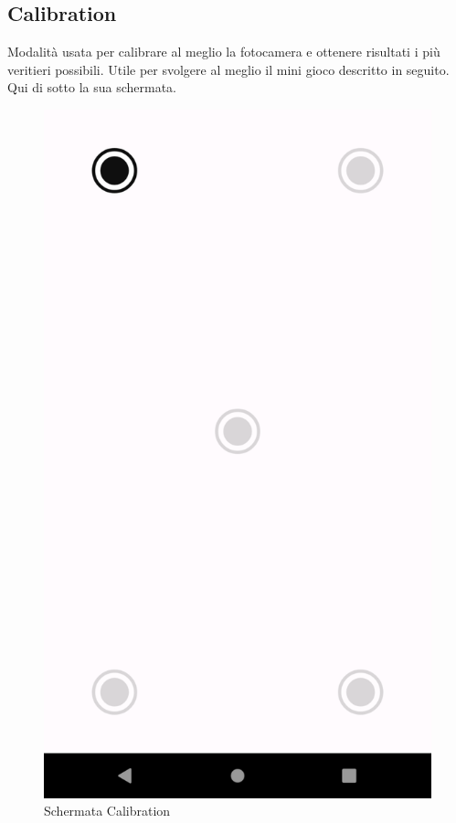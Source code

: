 \documentclass[11pt]{article}
\begin{document}
\subsection{Calibration}
Modalità usata per calibrare al meglio la fotocamera e ottenere risultati i più veritieri possibili. Utile per svolgere al meglio il mini gioco descritto in seguito. Qui di sotto la sua schermata.


\begin{figure}[h]
\caption{Schermata Calibration }
\centering
\includegraphics[scale=0.2]{img/calibration.png}
\end{figure}
\end{document}
